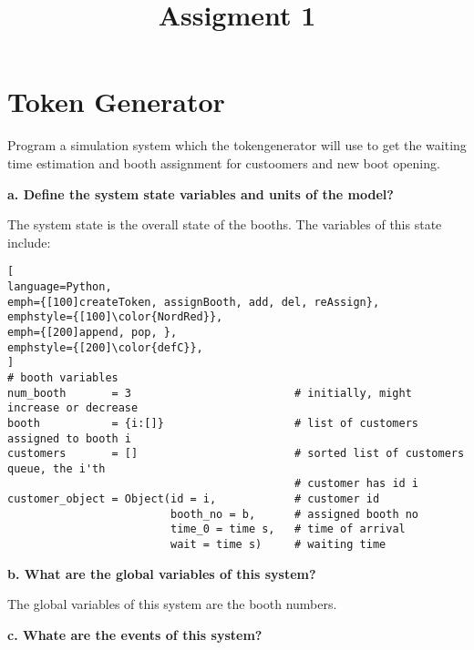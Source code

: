 \documentclass[article, 11pt, a4paper]{memoir}
\title{Assigment 1}
\begin{document}
\share \maketitle 

\chapter{Token Generator}

\prob{}
{}{}{
    Program a simulation system which the tokengenerator will use to get the waiting time
    estimation and booth assignment for custoomers and new boot opening.
}

\textbf{a. Define the system state variables and units of the model?}
\vspace{1em}

\begin{solution}
    [a]
    The system state is the overall state of the booths. The variables of this state
    include:
\begin{lstlisting}[
language=Python,
emph={[100]createToken, assignBooth, add, del, reAssign},
emphstyle={[100]\color{NordRed}},
emph={[200]append, pop, },
emphstyle={[200]\color{defC}},
]
# booth variables
num_booth       = 3                         # initially, might increase or decrease
booth           = {i:[]}                    # list of customers assigned to booth i
customers       = []                        # sorted list of customers queue, the i'th
                                            # customer has id i
customer_object = Object(id = i,            # customer id
                         booth_no = b,      # assigned booth no
                         time_0 = time s,   # time of arrival
                         wait = time s)     # waiting time
\end{lstlisting}
\end{solution}

\textbf{b. What are the global variables of this system?}
\vspace{1em}

\begin{solution}
    [b]
    The global variables of this system are the booth numbers.
\end{solution}

\textbf{c. Whate are the events of this system?}
\vspace{1em}
\end{document}

